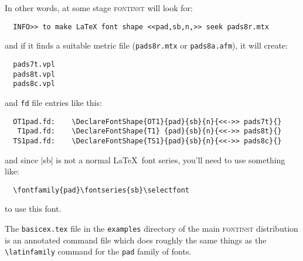 \documentclass[a4paper]{ltxguide}
\newcommand*{\setfilename}[1]{\texttt{#1}}
\newcommand*{\setpackagename}[1]{\textsc{#1}}
\newcommand{\fontinst}{\setpackagename{font\-inst}\xspace}
\newcommand{\fd} {\setfilename{fd}\xspace}
\begin{document}
In other words, at some stage \fontinst will look for:
\begin{verbatim}
  INFO>> to make LaTeX font shape <<pad,sb,n,>> seek pads8r.mtx
\end{verbatim}
and if it finds a suitable metric file (\texttt{pads8r.mtx} or
\texttt{pads8a.afm}), it will create:
\begin{verbatim}
  pads7t.vpl
  pads8t.vpl
  pads8c.vpl
\end{verbatim}
and \fd file entries like this:
\begin{verbatim}
  OT1pad.fd:    \DeclareFontShape{OT1}{pad}{sb}{n}{<<->> pads7t}{}
   T1pad.fd:    \DeclareFontShape{T1} {pad}{sb}{n}{<<->> pads8t}{}
  TS1pad.fd:    \DeclareFontShape{TS1}{pad}{sb}{n}{<<->> pads8c}{}
\end{verbatim}
and since |sb| is not a normal \LaTeX\ font series, you'll need to use
something like:
\begin{verbatim}
  \fontfamily{pad}\fontseries{sb}\selectfont
\end{verbatim}
to use this font.



The \texttt{basicex.tex} file in the \texttt{examples} directory of 
the main \fontinst distribution is an annotated command file which 
does roughly the same things as the \verb|\latinfamily| command for 
the \texttt{pad} family of fonts.
\end{document}
